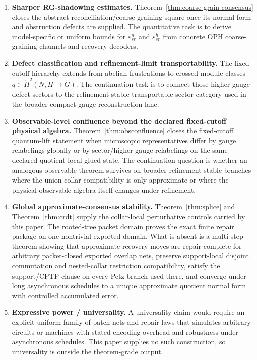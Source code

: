 \documentclass[11pt]{article}
\theoremstyle{remark}
\theoremstyle{plain}
\begin{document}
\begin{enumerate}
\item \textbf{Sharper RG-shadowing estimates.} Theorem~\ref{thm:coarse-grain-consensus} closes the abstract reconciliation/coarse-graining square once its normal-form and obstruction defects are supplied. The quantitative task is to derive model-specific or uniform bounds for \(\varepsilon^n_{sr}\) and \(\varepsilon^h_{sr}\) from concrete OPH coarse-graining channels and recovery decoders.

\item \textbf{Defect classification and refinement-limit transportability.} The fixed-cutoff hierarchy extends from abelian frustrations to crossed-module classes \(q\in \check H^2(N,H\to G)\). The continuation task is to connect those higher-gauge defect sectors to the refinement-stable transportable sector category used in the broader compact-gauge reconstruction lane.

\item \textbf{Observable-level confluence beyond the declared fixed-cutoff physical algebra.} Theorem~\ref{thm:obsconfluence} closes the fixed-cutoff quantum-lift statement when microscopic representatives differ by gauge relabelings globally or by sector/higher-gauge relabelings on the same declared quotient-local glued state. The continuation question is whether an analogous observable theorem survives on broader refinement-stable branches where the union-collar compatibility is only approximate or where the physical observable algebra itself changes under refinement.

\item \textbf{Global approximate-consensus stability.} Theorem~\ref{thm:splice} and Theorem~\ref{thm:crdt} supply the collar-local perturbative controls carried by this paper. The rooted-tree packet domain proves the exact finite repair package on one nontrivial exported domain. What is absent is a multi-step theorem showing that approximate recovery moves are repair-complete for arbitrary packet-closed exported overlap nets, preserve support-local disjoint commutation and nested-collar restriction compatibility, satisfy the support/CPTP clause on every Petz branch used there, and converge under long asynchronous schedules to a unique approximate quotient normal form with controlled accumulated error.

\item \textbf{Expressive power / universality.} A universality claim would require an explicit uniform family of patch nets and repair laws that simulates arbitrary circuits or machines with stated encoding overhead and robustness under asynchronous schedules. This paper supplies no such construction, so universality is outside the theorem-grade output.


\end{enumerate}
\end{document}
